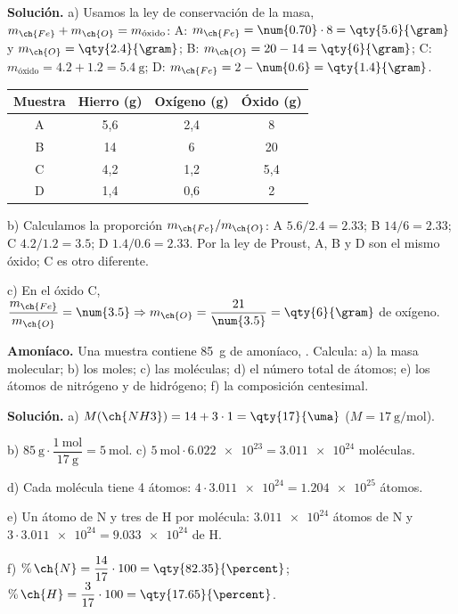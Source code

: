 \begin{example}
    \textbf{Solución.} a) Usamos la ley de conservación de la masa, \(m_{\ch{Fe}} + m_{\ch{O}} = m_{\text{óxido}}\):
    A: \(m_{\ch{Fe}} = \num{0.70} \cdot 8 = \qty{5.6}{\gram}\) y \(m_{\ch{O}} = \qty{2.4}{\gram}\); B: \(m_{\ch{O}} = 20 - 14 = \qty{6}{\gram}\);
    C: \(m_{\text{óxido}} = \num{4.2} + \num{1.2} = \qty{5.4}{\gram}\); D: \(m_{\ch{Fe}} = 2 - \num{0.6} = \qty{1.4}{\gram}\).
    \begin{center}
        \begin{tabular}{@{}cccc@{}}
            \toprule
            \textbf{Muestra} & \textbf{Hierro (g)} & \textbf{Oxígeno (g)} & \textbf{Óxido (g)} \\
            \midrule
            A & 5,6 & 2,4 & 8 \\[3pt]
            B & 14 & 6 & 20 \\[3pt]
            C & 4,2 & 1,2 & 5,4 \\[3pt]
            D & 1,4 & 0,6 & 2 \\
            \bottomrule
        \end{tabular}
    \end{center}
    b) Calculamos la proporción \(m_{\ch{Fe}}/m_{\ch{O}}\): A \(\num{5.6}/\num{2.4} = \num{2.33}\); B \(14/6 = \num{2.33}\);
    C \(\num{4.2}/\num{1.2} = \num{3.5}\); D \(\num{1.4}/\num{0.6} = \num{2.33}\). Por la ley de Proust, A, B y D son el mismo óxido;
    C es otro diferente.

    c) En el óxido C, \(\dfrac{m_{\ch{Fe}}}{m_{\ch{O}}} = \num{3.5} \Rightarrow m_{\ch{O}} = \dfrac{21}{\num{3.5}} = \qty{6}{\gram}\) de oxígeno.
\end{example}

\begin{example}
    \textbf{Amoníaco.} Una muestra contiene \qty{85}{\gram} de amoníaco, . Calcula: a) la masa molecular; b) los moles;
    c) las moléculas; d) el número total de átomos; e) los átomos de nitrógeno y de hidrógeno; f) la composición centesimal.

    \textbf{Solución.} a) \(M(\ch{NH3}) = 14 + 3 \cdot 1 = \qty{17}{\uma}\) (\(M = \qty{17}{\gram\per\mole}\)).

    b) \(\qty{85}{\gram} \cdot \dfrac{\qty{1}{\mole}}{\qty{17}{\gram}} = \qty{5}{\mole}\).
    c) \(\qty{5}{\mole} \cdot \num{6.022e23} = \num{3.011e24}\) moléculas.

    d) Cada molécula tiene 4 átomos: \(4 \cdot \num{3.011e24} = \num{1.204e25}\) átomos.

    e) Un átomo de N y tres de H por molécula: \(\num{3.011e24}\) átomos de N y \(3 \cdot \num{3.011e24} = \num{9.033e24}\) de H.

    f) \(\%\,\ch{N} = \dfrac{14}{17} \cdot 100 = \qty{82.35}{\percent}\); \(\%\,\ch{H} = \dfrac{3}{17} \cdot 100 = \qty{17.65}{\percent}\).
\end{example}

